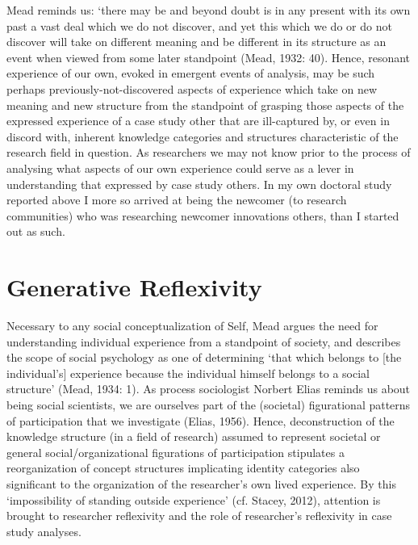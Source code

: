 Mead reminds us: ‘there may be and beyond doubt is in any present with its own past a vast deal which we do not discover, and yet this which we do or do not discover will take on different meaning and be different in its structure as an event when viewed from some later standpoint (Mead, 1932: 40). Hence, resonant experience of our own, evoked in emergent events of analysis, may be such perhaps previously-not-discovered aspects of experience which take on new meaning and new structure from the standpoint of grasping those aspects of the expressed experience of a case study other that are ill-captured by, or even in discord with, inherent knowledge categories and structures characteristic of the research field in question. As researchers we may not know prior to the process of analysing what aspects of our own experience could serve as a lever in understanding that expressed by case study others. In my own doctoral study reported above I more so arrived at being the newcomer (to research communities) who was researching newcomer innovations others, than I started out as such.

\section{Generative Reflexivity}
Necessary to any social conceptualization of Self, Mead argues the need for understanding individual experience from a standpoint of society, and describes the scope of social psychology as one of determining ‘that which belongs to [the individual’s] experience because the individual himself belongs to a social structure’ (Mead, 1934: 1). As process sociologist Norbert Elias reminds us about being social scientists, we are ourselves part of the (societal) figurational patterns of participation that we investigate (Elias, 1956). Hence, deconstruction of the knowledge structure (in a field of research) assumed to represent societal or general social/organizational figurations of participation stipulates a reorganization of concept structures implicating identity categories also significant to the organization of the researcher’s own lived experience. By this ‘impossibility of standing outside experience’ (cf. Stacey, 2012), attention is brought to researcher reflexivity and the role of researcher’s reflexivity in case study analyses. 

